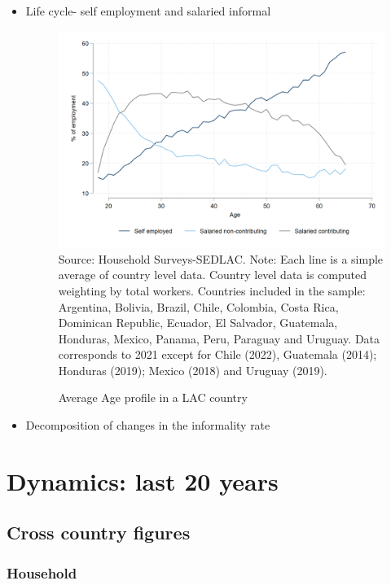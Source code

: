 \documentclass[english]{article}
\begin{document}
\begin{itemize}
\begin{itemize}
\item Life cycle- self employment and salaried informal
 \begin{figure}[!htb]
        \justifying
        \caption{Average Age profile in a LAC country}     
        \includegraphics[scale=.3]{latex/figures/Snapshot/age_profile.png}
        \label{fig:age_pro}
        \footnotesize{Source: Household Surveys-SEDLAC.}
        \footnotesize{Note: Each line is a simple average of country level data. Country level data is computed weighting by total workers. Countries included in the sample: Argentina, Bolivia, Brazil, Chile, Colombia, Costa Rica, Dominican Republic, Ecuador, El Salvador, Guatemala, Honduras, Mexico, Panama, Peru, Paraguay and Uruguay. Data corresponds to 2021 except for  Chile (2022), Guatemala (2014); Honduras (2019); Mexico (2018) and Uruguay (2019).}
        \end{figure}
        \item Decomposition of changes in the informality rate

\end{itemize}

     
     
\section{Dynamics: last 20 years}  

\subsection{Cross country figures}
\subsubsection{Household}


\end{itemize}
\end{document}
